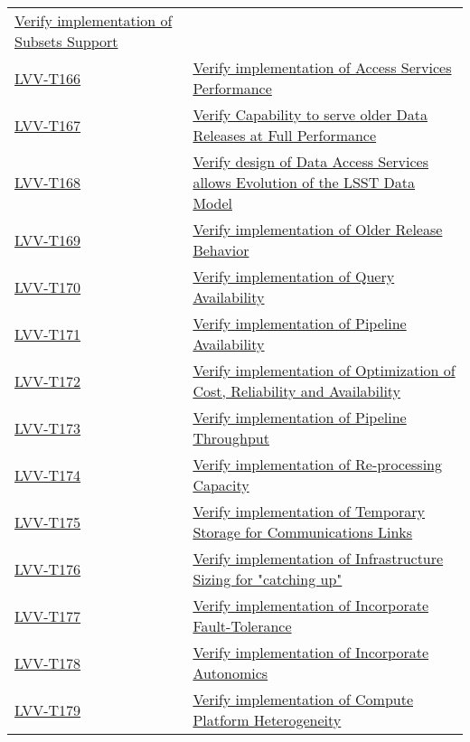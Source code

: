 \begin{longtable}[]{p{3cm}p{13cm}}
    \href{https://jira.lsstcorp.org/secure/Tests.jspa\#/testCase/LVV-T165}{Verify implementation of Subsets Support} \tabularnewline
    \hyperref[lvv-t166]{LVV-T166} &
    \href{https://jira.lsstcorp.org/secure/Tests.jspa\#/testCase/LVV-T166}{Verify implementation of Access Services Performance} \tabularnewline
    \hyperref[lvv-t167]{LVV-T167} &
    \href{https://jira.lsstcorp.org/secure/Tests.jspa\#/testCase/LVV-T167}{Verify Capability to serve older Data Releases at Full Performance} \tabularnewline
    \hyperref[lvv-t168]{LVV-T168} &
    \href{https://jira.lsstcorp.org/secure/Tests.jspa\#/testCase/LVV-T168}{Verify design of Data Access Services allows Evolution of the LSST Data Model} \tabularnewline
    \hyperref[lvv-t169]{LVV-T169} &
    \href{https://jira.lsstcorp.org/secure/Tests.jspa\#/testCase/LVV-T169}{Verify implementation of Older Release Behavior} \tabularnewline
    \hyperref[lvv-t170]{LVV-T170} &
    \href{https://jira.lsstcorp.org/secure/Tests.jspa\#/testCase/LVV-T170}{Verify implementation of Query Availability} \tabularnewline
    \hyperref[lvv-t171]{LVV-T171} &
    \href{https://jira.lsstcorp.org/secure/Tests.jspa\#/testCase/LVV-T171}{Verify implementation of Pipeline Availability} \tabularnewline
    \hyperref[lvv-t172]{LVV-T172} &
    \href{https://jira.lsstcorp.org/secure/Tests.jspa\#/testCase/LVV-T172}{Verify implementation of Optimization of Cost, Reliability and Availability} \tabularnewline
    \hyperref[lvv-t173]{LVV-T173} &
    \href{https://jira.lsstcorp.org/secure/Tests.jspa\#/testCase/LVV-T173}{Verify implementation of Pipeline Throughput} \tabularnewline
    \hyperref[lvv-t174]{LVV-T174} &
    \href{https://jira.lsstcorp.org/secure/Tests.jspa\#/testCase/LVV-T174}{Verify implementation of Re-processing Capacity} \tabularnewline
    \hyperref[lvv-t175]{LVV-T175} &
    \href{https://jira.lsstcorp.org/secure/Tests.jspa\#/testCase/LVV-T175}{Verify implementation of Temporary Storage for Communications Links} \tabularnewline
    \hyperref[lvv-t176]{LVV-T176} &
    \href{https://jira.lsstcorp.org/secure/Tests.jspa\#/testCase/LVV-T176}{Verify implementation of Infrastructure Sizing for "catching up"} \tabularnewline
    \hyperref[lvv-t177]{LVV-T177} &
    \href{https://jira.lsstcorp.org/secure/Tests.jspa\#/testCase/LVV-T177}{Verify implementation of Incorporate Fault-Tolerance} \tabularnewline
    \hyperref[lvv-t178]{LVV-T178} &
    \href{https://jira.lsstcorp.org/secure/Tests.jspa\#/testCase/LVV-T178}{Verify implementation of Incorporate Autonomics} \tabularnewline
    \hyperref[lvv-t179]{LVV-T179} &
    \href{https://jira.lsstcorp.org/secure/Tests.jspa\#/testCase/LVV-T179}{Verify implementation of Compute Platform Heterogeneity} \tabularnewline

\end{longtable}
